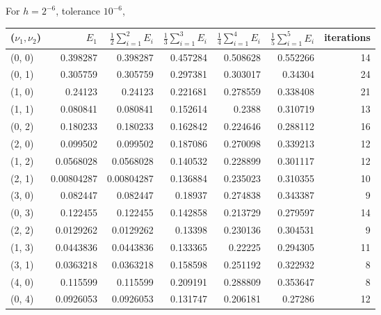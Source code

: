 \documentclass[12pt]{article}
\begin{document}
For $h=2^{-6}$, tolerance $10^{-6}$, \\
\begin{table}
\centering
\begin{tabular}{||l|rrrrr|r||}
\hline \hline
    ($\nu_1, \nu_2$)  &  $E_1$ & $\displaystyle\frac{1}{2} \sum_{i=1}^2 E_i $ &  $\displaystyle\frac{1}{3} \sum_{i=1}^3 E_i $  &  $\displaystyle\frac{1}{4} \sum_{i=1}^4 E_i $  &   $\displaystyle\frac{1}{5} \sum_{i=1}^5 E_i $  &   iterations \\
\hline \hline
 (0, 0)   & 0.398287   &     0.398287   &       0.457284 &       0.508628 &       0.552266 &           14 \\ \hline
 (0, 1)   & 0.305759   &     0.305759   &       0.297381 &       0.303017 &       0.34304  &           24 \\
 (1, 0)   & 0.24123    &     0.24123    &       0.221681 &       0.278559 &       0.338408 &           21 \\ \hline
 (1, 1)   & 0.080841   &     0.080841   &       0.152614 &       0.2388   &       0.310719 &           13 \\
 (0, 2)   & 0.180233   &     0.180233   &       0.162842 &       0.224646 &       0.288112 &           16 \\
 (2, 0)   & 0.099502   &     0.099502   &       0.187086 &       0.270098 &       0.339213 &           12 \\ \hline
 (1, 2)   & 0.0568028  &     0.0568028  &       0.140532 &       0.228899 &       0.301117 &           12 \\
 (2, 1)   & 0.00804287 &     0.00804287 &       0.136884 &       0.235023 &       0.310355 &           10 \\
 (3, 0)   & 0.082447   &     0.082447   &       0.18937  &       0.274838 &       0.343387 &            9 \\
 (0, 3)   & 0.122455   &     0.122455   &       0.142858 &       0.213729 &       0.279597 &           14 \\ \hline
 (2, 2)   & 0.0129262  &     0.0129262  &       0.13398  &       0.230136 &       0.304531 &            9 \\
 (1, 3)   & 0.0443836  &     0.0443836  &       0.133365 &       0.22225  &       0.294305 &           11 \\
 (3, 1)   & 0.0363218  &     0.0363218  &       0.158598 &       0.251192 &       0.322932 &            8 \\
 (4, 0)   & 0.115599   &     0.115599   &       0.209191 &       0.288809 &       0.353647 &            8 \\
 (0, 4)   & 0.0926053  &     0.0926053  &       0.131747 &       0.206181 &       0.27286  &           12 \\ \hline
\hline
\end{tabular}
\end{table}
\end{document}
